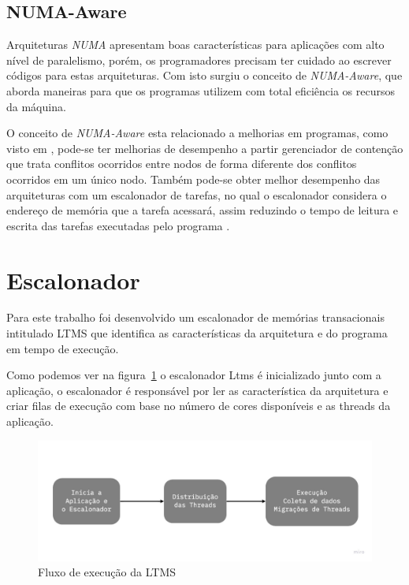 \documentclass[diss,capa]{texufpel}
\begin{document}
\subsection{NUMA-Aware}

Arquiteturas \emph{NUMA} apresentam boas características para aplicações com alto nível de paralelismo, porém, os programadores precisam ter cuidado ao escrever códigos para estas arquiteturas. Com isto surgiu o conceito de \emph{NUMA-Aware}, que aborda maneiras para que os programas utilizem com total eficiência os recursos da máquina.

O conceito de \emph{NUMA-Aware} esta relacionado a melhorias em programas, como visto em \cite{mohamedin2016}, pode-se ter melhorias de desempenho a partir gerenciador de contenção que trata conflitos ocorridos entre nodos de forma diferente dos conflitos ocorridos em um único nodo. Também pode-se obter melhor desempenho das arquiteturas com um escalonador de tarefas, no qual o escalonador considera o endereço de memória que a tarefa acessará, assim reduzindo o tempo de leitura e escrita das tarefas executadas pelo programa \cite{blagodurov2010}.

\section{\textbf{Escalonador}}

Para este trabalho foi desenvolvido um escalonador de memórias transacionais intitulado LTMS que identifica as características da arquitetura e do programa em tempo de execução.



Como podemos ver na figura~\ref{ltms_generic} o escalonador Ltms é inicializado junto com a aplicação, o escalonador é responsável por ler as característica da arquitetura e criar filas de execução com base no número de cores disponíveis e as threads da aplicação.

\begin{figure}[htbp]
  \centering \includegraphics[scale=.25]{images/ltms_generic}
\caption{Fluxo de execução da LTMS} 
\label{ltms_generic}
\end{figure}
\end{document}
